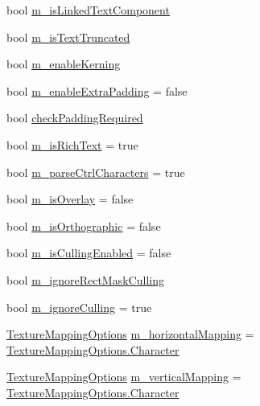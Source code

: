 \begin{DoxyCompactItemize}
\item 
bool \mbox{\hyperlink{class_t_m_pro_1_1_t_m_p___text_a05e9534d2c47603427dbc2246e77dc3b}{m\+\_\+is\+Linked\+Text\+Component}}
\item 
bool \mbox{\hyperlink{class_t_m_pro_1_1_t_m_p___text_a512e49dc276c2bbf7185f86a8a3097d8}{m\+\_\+is\+Text\+Truncated}}
\item 
bool \mbox{\hyperlink{class_t_m_pro_1_1_t_m_p___text_a6f5f3bf198f695c47d2ab0867f847e1e}{m\+\_\+enable\+Kerning}}
\item 
bool \mbox{\hyperlink{class_t_m_pro_1_1_t_m_p___text_ac94de683f3cd88748e19fb72f2d8a2f8}{m\+\_\+enable\+Extra\+Padding}} = false
\item 
bool \mbox{\hyperlink{class_t_m_pro_1_1_t_m_p___text_abd789ebc23933f5b01519bc169b55278}{check\+Padding\+Required}}
\item 
bool \mbox{\hyperlink{class_t_m_pro_1_1_t_m_p___text_aeb446bee251f04849a67249298bf5582}{m\+\_\+is\+Rich\+Text}} = true
\item 
bool \mbox{\hyperlink{class_t_m_pro_1_1_t_m_p___text_a2cc1882b39d6500eebd91a63af393ec3}{m\+\_\+parse\+Ctrl\+Characters}} = true
\item 
bool \mbox{\hyperlink{class_t_m_pro_1_1_t_m_p___text_a3479beecfea320d4b0a0e7d06c5a422b}{m\+\_\+is\+Overlay}} = false
\item 
bool \mbox{\hyperlink{class_t_m_pro_1_1_t_m_p___text_a56ea879f605cb03a3c81fc2fb669db29}{m\+\_\+is\+Orthographic}} = false
\item 
bool \mbox{\hyperlink{class_t_m_pro_1_1_t_m_p___text_a2c48813c6730702d138781d55d8e7857}{m\+\_\+is\+Culling\+Enabled}} = false
\item 
bool \mbox{\hyperlink{class_t_m_pro_1_1_t_m_p___text_a702f42f4e2c43fadfb18e8eff117ee3b}{m\+\_\+ignore\+Rect\+Mask\+Culling}}
\item 
bool \mbox{\hyperlink{class_t_m_pro_1_1_t_m_p___text_ae1e4d6df44d027c76b78da9dac8c5c68}{m\+\_\+ignore\+Culling}} = true
\item 
\mbox{\hyperlink{namespace_t_m_pro_ab5c7877e6f736cba8b501c877bf5b612}{Texture\+Mapping\+Options}} \mbox{\hyperlink{class_t_m_pro_1_1_t_m_p___text_a2a1bf445fc500f5b199b9e055e63d7c2}{m\+\_\+horizontal\+Mapping}} = \mbox{\hyperlink{namespace_t_m_pro_ab5662f47179bf1b81c575ecf80b24065a76a40e4f974fd895a0a2598c1cee28b4}{Texture\+Mapping\+Options.\+Character}}
\item 
\mbox{\hyperlink{namespace_t_m_pro_ab5c7877e6f736cba8b501c877bf5b612}{Texture\+Mapping\+Options}} \mbox{\hyperlink{class_t_m_pro_1_1_t_m_p___text_a9003aeb50443cb0aab1e604103b871b3}{m\+\_\+vertical\+Mapping}} = \mbox{\hyperlink{namespace_t_m_pro_ab5662f47179bf1b81c575ecf80b24065a76a40e4f974fd895a0a2598c1cee28b4}{Texture\+Mapping\+Options.\+Character}}

\end{DoxyCompactItemize}
